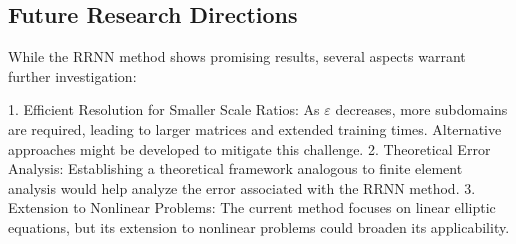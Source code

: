 \documentclass[11pt]{article}
\begin{document}
\subsection{Future Research Directions}

While the RRNN method shows promising results, several aspects warrant further investigation:

1. Efficient Resolution for Smaller Scale Ratios: As $\varepsilon$ decreases, more subdomains are required, leading to larger matrices and extended training times. Alternative approaches might be developed to mitigate this challenge.
2. Theoretical Error Analysis: Establishing a theoretical framework analogous to finite element analysis would help analyze the error associated with the RRNN method.
3. Extension to Nonlinear Problems: The current method focuses on linear elliptic equations, but its extension to nonlinear problems could broaden its applicability.
\end{document}
